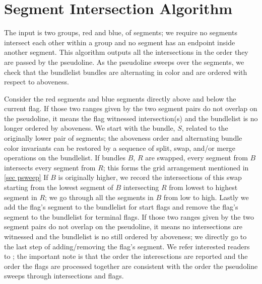 \documentclass[11pt]{article}
\begin{document}
\section{Segment Intersection Algorithm} \label{sec inter}
The input is two groups, red and blue, of segments; we require no segments intersect each other within a group and no segment has an endpoint inside another segment.
This algorithm outputs all the intersections in the order they are passed by the pseudoline.
As the pseudoline sweeps over the segments, we check that the bundlelist bundles are alternating in color and are ordered with respect to aboveness.

Consider the red segments and blue segments directly above and below the current flag. 
If those two ranges given by the two segment pairs do not overlap on the pseudoline, it means the flag witnessed intersection(s) and the bundlelist is no longer ordered by aboveness.
We start with the bundle, $S$, related to the originally lower pair of segments; the aboveness order and alternating bundle color invariants can be restored by a sequence of split, swap, and/or merge operations on the bundlelist.
If bundles $B$, $R$ are swapped, every segment from $B$ intersects every segment from $R$; this forms the grid arrangement mentioned in \ref{sec psweep}
If $B$ is originally higher, we record the intersections of this swap starting from the lowest segment of $B$ intersecting $R$ from lowest to highest  segment in $R$; we go through all the segments in $B$ from low to high.
Lastly we add the flag's segment to the bundlelist for start flags and remove the flag's segment to the bundlelist for terminal flags.
If those two ranges given by the two segment pairs do not overlap on the pseudoline, it means no intersections are witnessed and the bundlelist is no still ordered by aboveness; we directly go to the last step of adding/removing the flag's segment.
We refer interested readers to \cite{MS}; the important note is that the order the interesctions are reported and the order the flags are processed together are consistent with the order the pseudoline sweeps through intersections and flags.
\end{document}
